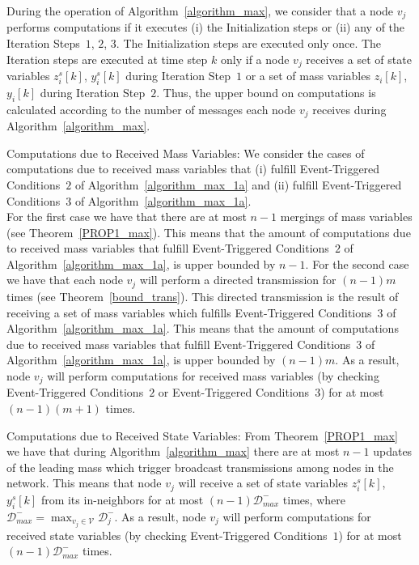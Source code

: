 \documentclass[twocolumn]{autart}    %
\begin{document}
\begin{pf}
During the operation of Algorithm~\ref{algorithm_max}, we consider that a node $v_j$ performs computations if it executes (i) the Initialization steps or (ii) any of the Iteration Steps~$1$, $2$, $3$. 
The Initialization steps are executed only once. 
The Iteration steps are executed at time step $k$ only if a node $v_j$ receives a set of state variables $z^s_i[k]$, $y^s_i[k]$ during Iteration Step~$1$ or a set of mass variables $z_i[k]$, $y_i[k]$ during Iteration Step~$2$. 
Thus, the upper bound on computations is calculated according to the number of messages each node $v_j$ receives during Algorithm~\ref{algorithm_max}. 

Computations due to Received Mass Variables: 
We consider the cases of computations due to received mass variables that (i) fulfill Event-Triggered Conditions~$2$ of Algorithm~\ref{algorithm_max_1a} and (ii) fulfill Event-Triggered Conditions~$3$ of Algorithm~\ref{algorithm_max_1a}. 
\\ \noindent
For the first case we have that there are at most $n-1$ mergings of mass variables (see Theorem~\ref{PROP1_max}). 
This means that the amount of computations due to received mass variables that fulfill Event-Triggered Conditions~$2$ of Algorithm~\ref{algorithm_max_1a}, is upper bounded by $n-1$. 
For the second case we have that each node $v_j$ will perform a directed transmission for $(n-1)m$ times (see Theorem~\ref{bound_trans}). 
This directed transmission is the result of receiving a set of mass variables which fulfills Event-Triggered Conditions~$3$ of Algorithm~\ref{algorithm_max_1a}. 
This means that the amount of computations due to received mass variables that fulfill Event-Triggered Conditions~$3$ of Algorithm~\ref{algorithm_max_1a}, is upper bounded by $(n-1)m$. 
As a result, node $v_j$ will perform computations for received mass variables (by checking Event-Triggered Conditions~$2$ or Event-Triggered Conditions~$3$) for at most $(n-1)(m+1)$ times.

Computations due to Received State Variables: 
From Theorem~\ref{PROP1_max} we have that during Algorithm~\ref{algorithm_max} there are at most $n-1$ updates of the leading mass which trigger broadcast transmissions among nodes in the network. 
This means that node $v_j$ will receive a set of state variables $z^s_i[k]$, $y^s_i[k]$ from its in-neighbors for at most $(n-1)\mathcal{D}_{max}^-$ times, where $\mathcal{D}_{max}^- = \max_{v_j \in \mathcal{V}} \mathcal{D}_j^-$. 
As a result, node $v_j$ will perform computations for received state variables (by checking Event-Triggered Conditions~$1$) for at most $(n-1)\mathcal{D}_{max}^-$ times. 


\end{pf}
\end{document}
